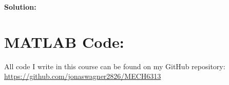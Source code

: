 \documentclass[letter]{article}
\begin{document}
\noindent
\textbf{Solution:}





\newpage
\appendix
\section{MATLAB Code:}\label{apx:matlab}
All code I write in this course can be found on my GitHub repository:\\
\href{https://github.com/jonaswagner2826/MECH6313}{https://github.com/jonaswagner2826/MECH6313}
%
\end{document}
